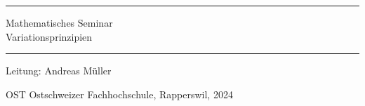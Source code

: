 %
%
\pagestyle{fancy}
\frontmatter
\newcommand\HRule{\noindent\rule{\linewidth}{1.5pt}}
\begin{titlepage}
\HRule
\vspace*{5pt}
\begin{flushright}
{
\LARGE
Mathematisches Seminar\\
\vspace*{20pt}
\Huge
Variationsprinzipien%
}%
\vspace*{5pt}
\end{flushright}
\HRule
\begin{flushright}
\vspace{60pt}
\Large
Leitung: Andreas Müller\\
\vspace{40pt}
\Large

\end{flushright}
\begin{center}
OST Ostschweizer Fachhochschule, Rapperswil, 2024
\end{center}
\end{titlepage}

